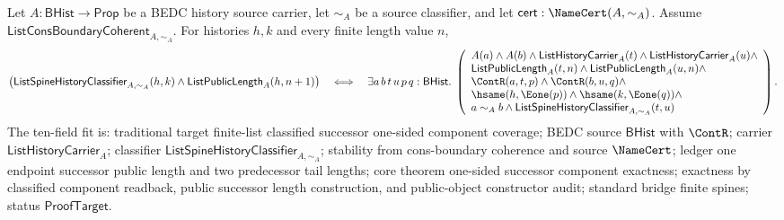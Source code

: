 \begin{theorem}
\label{thm:list-classified-successor-one-sided-component-exactness}
Let $A:\mathsf{BHist}\to\mathsf{Prop}$ be a BEDC history source carrier, let
$\sim_A$ be a source classifier, and let
$\mathsf{cert}:\NameCert(A,\sim_A)$. Assume
$\mathsf{ListConsBoundaryCoherent}_{A,\sim_A}$. For histories $h,k$ and every
finite length value $n$,
$$
\left(
\mathsf{ListSpineHistoryClassifier}_{A,\sim_A}(h,k)\land
\mathsf{ListPublicLength}_A(h,n+1)
\right)
\quad\Longleftrightarrow\quad
\exists a\,b\,t\,u\,p\,q:\mathsf{BHist}.\;
\left(
\begin{array}{l}
A(a)\land A(b)\land
\mathsf{ListHistoryCarrier}_A(t)\land
\mathsf{ListHistoryCarrier}_A(u)\land\\
\mathsf{ListPublicLength}_A(t,n)\land
\mathsf{ListPublicLength}_A(u,n)\land\\
\ContR(a,t,p)\land \ContR(b,u,q)\land\\
\hsame(h,\Eone(p))\land \hsame(k,\Eone(q))\land\\
a\sim_A b\land
\mathsf{ListSpineHistoryClassifier}_{A,\sim_A}(t,u)
\end{array}
\right).
$$
The ten-field fit is: traditional target finite-list classified successor
one-sided component coverage; BEDC source $\mathsf{BHist}$ with $\ContR$;
carrier $\mathsf{ListHistoryCarrier}_A$; classifier
$\mathsf{ListSpineHistoryClassifier}_{A,\sim_A}$; stability from
cons-boundary coherence and source $\NameCert$; ledger one endpoint successor
public length and two predecessor tail lengths; core theorem one-sided
successor component exactness; exactness by classified component readback,
public successor length construction, and public-object constructor audit;
standard bridge finite spines; status $\mathsf{ProofTarget}$.
\end{theorem}
